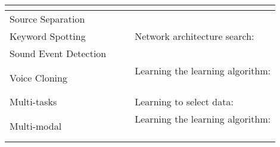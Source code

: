 \begin{table*}[tb!]
{\begin{tabular}{|l||l|l|l|}
{                            \cite{Baruwa:IJSER19}}
        \\ \hline
        Source Separation
          & \cite{SP-ICASSP21}
          &
          &
        \\ \hline
        Keyword Spotting
          &  \cite{Chen:arXiv18}
          &
          & \tabincell{l}{Network architecture search:                  \\
                            \cite{Mazzawi:INTERSPEECH19}}
        \\ \hline
        Sound Event Detection
          &
          & \tabincell{l}{\cite{Shimada:arXiv19}                        \\
                          \cite{Chou:ICASSP19}}
          &
        \\ \hline
        Voice Cloning
          &
          &
          & \tabincell{l}{Learning the learning algorithm:              \\
                            \cite{Chen:ICLR19}                          \\
                            \cite{Serra:NeurIPS19}}
      \\ \hline \hline  %
        Multi-tasks
          &
          &
          & \tabincell{l}{Learning to select data:                      \\
                            \cite{tarunesh2021meta}}
        \\ \hline
        Multi-modal
          &
          & \cite{Eloff:ICASSP19}
          & \tabincell{l}{Learning the learning algorithm:              \\
                            \cite{Suris:arXiv19}                        \\
                            \cite{learningToLearn:metaNLP21}}
        \\ \hline
      \end{tabular}
    }
\end{table*}

\footnotesize


